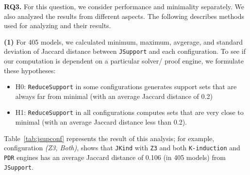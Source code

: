 %
%
\vspace{6pt}
\noindent{}
 \vspace{6pt}

\textbf{RQ3.}   For this question, we consider performance and minimality separately.  We also analyzed the results from different aspects. The following describes methods used for analyzing and their results.

\textbf{(1)} For 405 models, we calculated minimum, maximum, avgerage, and standard deviation of Jaccard distance between \texttt{JSupport} and each configuration. To see if our computation is dependent on a particular solver/ proof engine, we formulate these hypotheses:
\begin{itemize}
  \item H0: \texttt{ReduceSupport} in some configurations generates support sets that are always far from minimal (with an average Jaccard distance of 0.2)
  \item H1: \texttt{ReduceSupport} in all configurations computes sets that are very close to minimal (with an average Jaccard distance less than 0.2).
\end{itemize}

Table~\ref{tab:jsupconf} represents the result of this analysis; for example, configuration \emph{(Z3, Both)}, shows that \texttt{\texttt{JKind}} with \texttt{Z3} and both \texttt{K-induction} and \texttt{PDR} engines has an average Jaccard distance of 0.106 (in 405 models) from \texttt{JSupport}.


